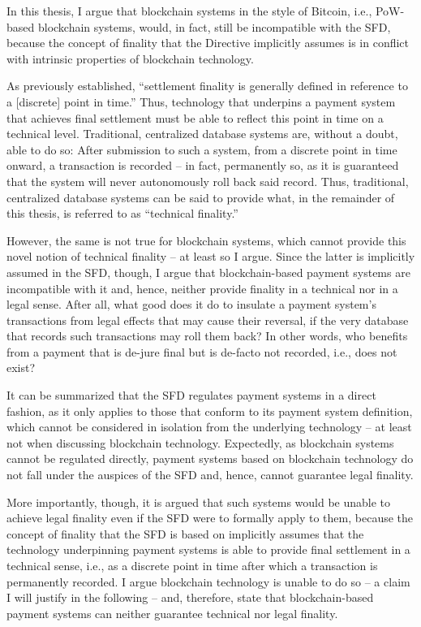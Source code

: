 In this thesis, I argue that blockchain systems in the style of Bitcoin, i.e., PoW-based blockchain systems, would, in fact, still be incompatible with the SFD, because the concept of finality that the Directive implicitly assumes is in conflict with intrinsic properties of blockchain technology.

As previously established, ``settlement finality is generally defined in reference to a [discrete] point in time.'' \autocite{liao2017}
Thus, technology that underpins a payment system that achieves final settlement must be able to reflect this point in time on a technical level.
Traditional, centralized database systems are, without a doubt, able to do so:
After submission to such a system, from a discrete point in time onward, a transaction is recorded -- in fact, permanently so, as it is guaranteed that the system will never autonomously roll back said record.
Thus, traditional, centralized database systems can be said to provide what, in the remainder of this thesis, is referred to as ``technical finality.''

However, the same is not true for blockchain systems, which cannot provide this novel notion of technical finality -- at least so I argue.
Since the latter is implicitly assumed in the SFD, though, I argue that blockchain-based payment systems are incompatible with it and, hence, neither provide finality in a technical nor in a legal sense. After all, what good does it do to insulate a payment system's transactions from legal effects that may cause their reversal, if the very database that records such transactions may roll them back?
In other words, who benefits from a payment that is de-jure final but is de-facto not recorded, i.e., does not exist?

It can be summarized that the SFD regulates payment systems in a direct fashion, as it only applies to those that conform to its payment system definition, which cannot be considered in isolation from the underlying technology -- at least not when discussing blockchain technology.
Expectedly, as blockchain systems cannot be regulated directly, payment systems based on blockchain technology do not fall under the auspices of the SFD and, hence, cannot guarantee legal finality.

More importantly, though, it is argued that such systems would be unable to achieve legal finality even if the SFD were to formally apply to them, because the concept of finality that the SFD is based on implicitly assumes that the technology underpinning payment systems is able to provide final settlement in a technical sense, i.e., as a discrete point in time after which a transaction is permanently recorded.
I argue blockchain technology is unable to do so -- a claim I will justify in the following -- and, therefore, state that blockchain-based payment systems can neither guarantee technical nor legal finality.
